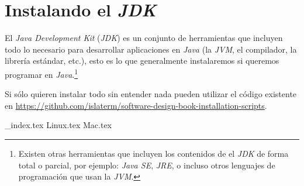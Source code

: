 \section{Instalando el \textit{JDK}}
  El \textit{Java Development Kit} (\textit{JDK}) es un conjunto de herramientas que incluyen 
  todo lo necesario para desarrollar aplicaciones en \textit{Java} (la \textit{JVM}, el 
  compilador, la librería estándar, etc.), esto es lo que generalmente instalaremos si queremos
  programar en \textit{Java}.\footnote{Existen otras herramientas que incluyen los contenidos de 
  el \textit{JDK} de forma total o parcial, por ejemplo: \textit{Java SE}, \textit{JRE}, o 
  incluso otros lenguajes de programación que usan la \textit{JVM}.}

  Si sólo quieren instalar todo sin entender nada pueden utilizar el código existente en
  \url{https://github.com/islaterm/software-design-book-installation-scripts}.

  {_index.tex}
  {Linux.tex}
  {Mac.tex}
